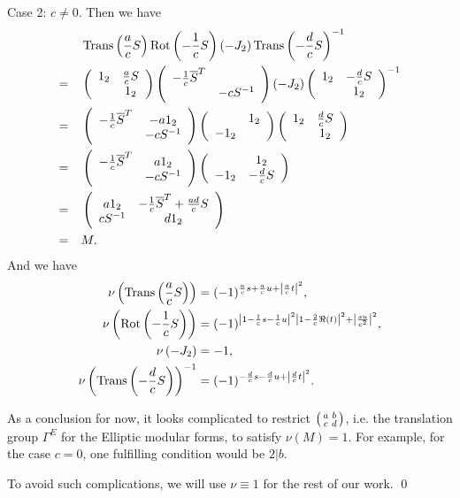 \begin{remark}
Case 2: $c\neq 0$. Then we have
\begin{align*}
& \operatorname{Trans}\left(\frac{a}{c}S\right) \operatorname{Rot}\left(-\frac{1}{c}S\right) (-J_2) \operatorname{Trans}\left(-\frac{d}{c}S\right)^{-1} \\
=\quad & \left( \begin{array}{cc} 1_2 & \frac{a}{c}S \\  & 1_2 \end{array} \right)
\left( \begin{array}{cc} -\frac{1}{c}\overline{S}^T &  \\  & -cS^{-1} \end{array} \right)
(-J_2)
\left( \begin{array}{cc} 1_2 & -\frac{d}{c}S \\  & 1_2 \end{array} \right)^{-1} \\
=\quad &
\left( \begin{array}{cc} -\frac{1}{c}\overline{S}^T & -a 1_2 \\  & -cS^{-1} \end{array} \right)
\left( \begin{array}{cc}  & 1_2 \\ -1_2 &  \end{array} \right)
\left( \begin{array}{cc} 1_2 & \frac{d}{c}S \\  & 1_2 \end{array} \right) \\
=\quad &
\left( \begin{array}{cc} -\frac{1}{c}\overline{S}^T & a 1_2 \\  & -cS^{-1} \end{array} \right)
\left( \begin{array}{cc}  & 1_2 \\ -1_2 & -\frac{d}{c}S \end{array} \right) \\
=\quad &
\left( \begin{array}{cc} a 1_2 & -\frac{1}{c}\overline{S}^T + \frac{ad}{c}S \\ cS^{-1} & d 1_2 \end{array} \right) \\
=\quad &
M.
\end{align*}
And we have
\begin{align*}
\nu\left( \operatorname{Trans}\left(\frac{a}{c}S \right) \right) & = (-1)^{\frac{a}{c}s + \frac{a}{c}u + \left|\frac{a}{c} t \right|^2} , \\
\nu\left( \operatorname{Rot}\left(-\frac{1}{c}S \right) \right) & = (-1)^{\left|1-\frac{1}{c}s -\frac{1}{c}u\right|^2 \left|1 - \frac{2}{c}\Re(t) \right|^2 + \left| \frac{su}{c^2} \right|^2 } , \\
\nu\left( -J_2 \right) & = -1 , \\
\nu\left( \operatorname{Trans}\left(-\frac{d}{c}S \right) \right)^{-1} & = (-1)^{-\frac{d}{c}s - \frac{d}{c}u + \left|\frac{d}{c} t \right|^2} . \\
\end{align*}

As a conclusion for now, it looks complicated to restrict $\left( \begin{smallmatrix} a & b \\ c & d \end{smallmatrix} \right)$, i.e. the translation group $\Gamma^E$ for the Elliptic modular forms, to satisfy $\nu(M)=1$. For example, for the case $c=0$, one fulfilling condition would be $2 | b$.

To avoid such complications, we will use $\nu \equiv 1$ for the rest of our work.
\qed
\end{remark}

\

